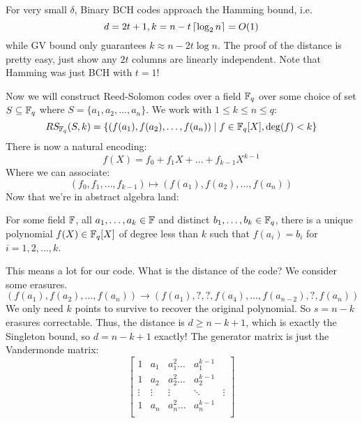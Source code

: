 For very small $\delta$, Binary BCH codes approach the Hamming bound, i.e.
\[ d = 2t + 1, k = n - t \left\lceil \log_2 n \right\rceil = O(1) \]
while GV bound only guarantees $k \approx n - 2t \log n$.
The proof of the distance is pretty easy, just show any $2t$ columns are linearly independent.
Note that Hamming was just BCH with $t = 1$!

Now we will construct Reed-Solomon codes over a field
$\operatorname{\mathbb{F}}_q$ over some choice of set $S \subseteq \operatorname{\mathbb{F}}_q$ where $S = \{a_1, a_2, \dots, a_n\}$. We work with $1 \leq k \leq n \leq q$:
\[ RS_{\operatorname{\mathbb{F}}_q}(S, k) = \{ (f(a_1), f(a_2), \dots, f(a_n)) \mid f \in \operatorname{\mathbb{F}}_q[X], \deg(f) < k \} \]
There is now a natural encoding:
\[ f(X) = f_0 + f_1 X + \dots + f_{k - 1} X^{k - 1} \]
Where we can associate:
\[ (f_0, f_1, \dots, f_{k - 1}) \mapsto (f(a_1), f(a_2), \dots, f(a_n)) \]
Now that we're in abstract algebra land:
\begin{theorem}[Interpolation]
    For some field $\operatorname{\mathbb{F}}$, all $a_1, \dots, a_k \in \operatorname{\mathbb{F}}$ and distinct $b_1, \dots, b_k \in \operatorname{\mathbb{F}}_q$,
    there is a unique polynomial $f(X) \in \operatorname{\mathbb{F}}_q[X]$
    of degree less than $k$ such that $f(a_i) = b_i$ for $i = 1, 2, \dots, k$.
\end{theorem}
This means a lot for our code. What is the distance of the code? We consider some erasures.
\[ (f(a_1), f(a_2), \dots, f(a_n)) \to (f(a_1), ?, ?, f(a_4), \dots, f(a_{n - 2}), ?, f(a_n)) \]
We only need $k$ points to survive to recover the original polynomial. So $s = n - k $ erasures correctable.
Thus, the distance is $d \geq n - k + 1$,
which is exactly the Singleton bound, so $d = n - k + 1$ exactly!
The generator matrix is just the Vandermonde matrix:
\[ \begin{bmatrix}
    1 & a_1 & a_1^2 \dots & a_1^{k - 1} \\
    1 & a_2 & a_2^2 \dots & a_2^{k - 1} \\
    \vdots & \vdots & \vdots & \ddots & \vdots \\
    1 & a_n & a_n^2 \dots & a_n^{k - 1} \\
\end{bmatrix} \]